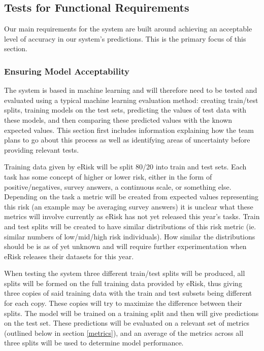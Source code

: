 \documentclass[12pt, titlepage]{article}
\begin{document}
\subsection{Tests for Functional Requirements}

Our main requirements for the system are built around achieving an acceptable level of accuracy in our system's predictions. This is the primary focus of this section.

\subsubsection{Ensuring Model Acceptability}

The system is based in machine learning and will therefore need to be tested and evaluated using a typical machine learning evaluation method: creating train/test splits, training models on the test sets, predicting the values of test data with these models, and then comparing these predicted values with the known expected values. This section first includes information explaining how the team plans to go about this process as well as identifying areas of uncertainty before providing relevant tests.

 \label{TTD}

Training data given by eRisk will be split 80/20 into train and test sets. Each task has some concept of higher or lower risk, either in the form of positive/negatives, survey answers, a continuous scale, or something else. Depending on the task a metric will be created from expected values representing this risk (an example may be averaging survey answers) it is unclear what these metrics will involve currently as eRisk has not yet released this year’s tasks. Train and test splits will be created to have similar distributions of this risk metric (ie. similar numbers of low/mid/high risk individuals). How similar the distributions should be is as of yet unknown and will require further experimentation when eRisk releases their datasets for this year.

When testing the system three different train/test splits will be produced, all splits will be formed on the full training data provided by eRisk, thus giving three copies of said training data with the train and test subsets being different for each copy. These copies will try to maximize the difference between their splits. The model will be trained on a training split and then will give predictions on the test set. These predictions will be evaluated on a relevant set of metrics (outlined below in section \ref{metrics}), and an average of the metrics across all three splits will be used to determine model performance.
\end{document}
